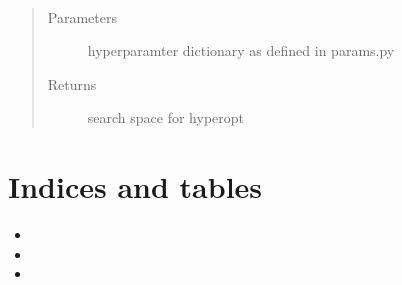 \documentclass[letterpaper,10pt,english]{sphinxmanual}
\begin{document}

\begin{fulllineitems}
\label{\detokenize{index:bo.tpe_hyperopt.convert_params}}~\begin{quote}\begin{description}
\item[{Parameters}] \leavevmode
{} \textendash{} hyperparamter dictionary as defined in params.py

\item[{Returns}] \leavevmode
search space for hyperopt

\end{description}\end{quote}

\end{fulllineitems}

\label{\detokenize{index:module-bo.utils_bo}}

\begin{fulllineitems}
\label{\detokenize{index:bo.utils_bo.evaluate_dataset}}
\end{fulllineitems}


\begin{fulllineitems}
\label{\detokenize{index:bo.utils_bo.evaluate_random}}
\end{fulllineitems}



\chapter{Indices and tables}
\label{\detokenize{index:welcome-to-hpo-s-documentation}}\label{\detokenize{index:indices-and-tables}}\begin{itemize}
\item {} 

\item {} 

\item {} 

\end{itemize}
\end{document}

